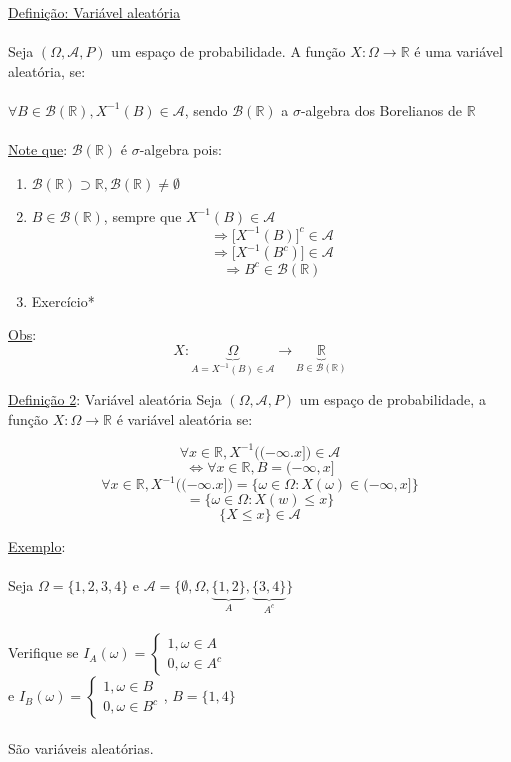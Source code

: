 \documentclass[a4paper,12pt]{article}
\begin{document}
\underline{Definição: Variável aleatória}\\
\\
Seja $(\Omega,\mathscr{A},P)$ um espaço de probabilidade. A função $X:\Omega \longrightarrow \mathbb{R} $ é uma variável aleatória, se:\\
\\
$\forall  B \in \mathscr{B}(\mathbb{R}) , X^{-1}(B)\in \mathscr{A}$, sendo $\mathscr{B}(\mathbb{R})$ a $\sigma$-algebra dos Borelianos de $\mathbb{R}$\\
\\
\underline{Note que}: $\mathscr{B}(\mathbb{R}) $ é $\sigma$-algebra pois:
\begin{enumerate}[label=\roman*)]
\item $\mathscr{B}(\mathbb{R}) \supset \mathbb{R},\mathscr{B}(\mathbb{R})\ne \emptyset$
\item  $B \in \mathscr{B}(\mathbb{R})$, sempre que $X^{-1}(B)\in \mathscr{A}$
$$\Rightarrow \bigg[ X^{-1}(B)\bigg]^c \in \mathscr{A} $$
$$\Rightarrow \bigg[ X^{-1}(B^c)\bigg] \in \mathscr{A} $$
$$\Rightarrow B^c \in \mathscr{B}(\mathbb{R}) $$
\item Exercício*



\end{enumerate}

\underline{Obs}: 
$$X:\underbrace{\Omega}_{A=X^{-1}(B)\in \mathscr{A}} \longrightarrow \underbrace{\mathbb{R}}_{B \in \mathscr{B}( \mathbb{R})}  $$

\underline{Definição 2}: Variável aleatória
Seja $(\Omega,\mathscr{A},P)$ um espaço de probabilidade, a função $X:\Omega \longrightarrow \mathbb{R} $ é variável aleatória se:

$$\forall x \in \mathbb{R}, X^{-1}\bigg( (-\infty.x] \bigg) \in \mathscr{A} $$
$$\Leftrightarrow \forall x \in \mathbb{R}, B=(-\infty,x]$$
$$\forall x \in \mathbb{R},   X^{-1}\bigg( (-\infty.x] \bigg) = \{ \omega \in \Omega: X(\omega)\in (-\infty,x] \}$$
$$= \{\omega \in \Omega: X(w)\le x \} $$
$$\{ X\le x \}\in \mathscr{A}$$

\newpage
\underline{Exemplo}:\\
\\
Seja $\Omega = \{1,2,3,4\}$ e $\mathscr{A} = \bigg\{\emptyset,\Omega, \underbrace{\{1,2\}}_{A} , \underbrace{\{3,4\}}_{A^c} \bigg\}$\\
\\
Verifique se $I_A(\omega) = \begin{cases}
1,\omega \in A\\
0, \omega \in A^c
\end{cases} $ 
\\
e $I_B(\omega) = \begin{cases}
1,\omega \in B\\
0, \omega \in B^c
\end{cases} $, $B=\{1,4\}$\\
\\
São variáveis aleatórias.\\
\\
\end{document}
